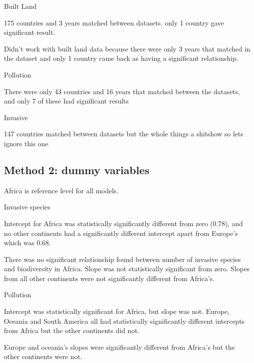 \documentclass[11pt, a4paper, titlepage]{article}
\begin{document}
	Built Land \newline
	
	175 countries and 3 years matched between datasets. only 1 country gave significant result.
	
	Didn't work with built land data because there were only 3 years that matched in the dataset and only 1 country came back as having a significant relationship. \newline
	
	Pollution \newline
	
	There were only 43 countries and 16 years that matched between the datasets, and only 7 of these had significant results \newline
	
	Invasive \newline
	
	147 countries matched between datasets but the whole things a shitshow so lets ignore this one
	
	
	
	
	 
	\subsection*{Method 2: dummy variables}
	 
	 Africa is reference level for all models. \newline

Invasive species \newline

Intercept for Africa was statistically significantly different from zero (0.78), and no other continents had a significantly different intercept apart from Europe's which was 0.68. 

There was no significant relationship found between number of invasive species and biodiversity in Africa. Slope was not statistically significant from zero. Slopes from all other continents were not significantly different from Africa's. \newline

Pollution \newline

Intercept was statistically significant for Africa, but slope was not. Europe, Oceania and South America all had statistically significantly different intercepts from Africa but the other continents did not.

Europe and oceania's slopes were significantly different from Africa's but the other continents were not. \newline
\end{document}
